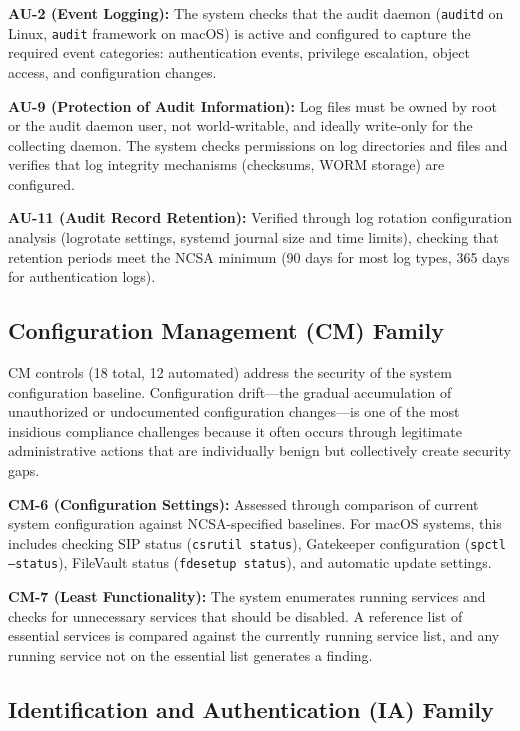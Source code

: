 \documentclass[12pt,oneside]{report}
\begin{document}
\textbf{AU-2 (Event Logging):} The system checks that the audit daemon (\texttt{auditd} on Linux, \texttt{audit} framework on macOS) is active and configured to capture the required event categories: authentication events, privilege escalation, object access, and configuration changes.

\textbf{AU-9 (Protection of Audit Information):} Log files must be owned by root or the audit daemon user, not world-writable, and ideally write-only for the collecting daemon. The system checks permissions on log directories and files and verifies that log integrity mechanisms (checksums, WORM storage) are configured.

\textbf{AU-11 (Audit Record Retention):} Verified through log rotation configuration analysis (logrotate settings, systemd journal size and time limits), checking that retention periods meet the NCSA minimum (90 days for most log types, 365 days for authentication logs).

\subsection{Configuration Management (CM) Family}

CM controls (18 total, 12 automated) address the security of the system configuration baseline. Configuration drift—the gradual accumulation of unauthorized or undocumented configuration changes—is one of the most insidious compliance challenges because it often occurs through legitimate administrative actions that are individually benign but collectively create security gaps.

\textbf{CM-6 (Configuration Settings):} Assessed through comparison of current system configuration against NCSA-specified baselines. For macOS systems, this includes checking SIP status (\texttt{csrutil status}), Gatekeeper configuration (\texttt{spctl --status}), FileVault status (\texttt{fdesetup status}), and automatic update settings.

\textbf{CM-7 (Least Functionality):} The system enumerates running services and checks for unnecessary services that should be disabled. A reference list of essential services is compared against the currently running service list, and any running service not on the essential list generates a finding.

\subsection{Identification and Authentication (IA) Family}
\end{document}

